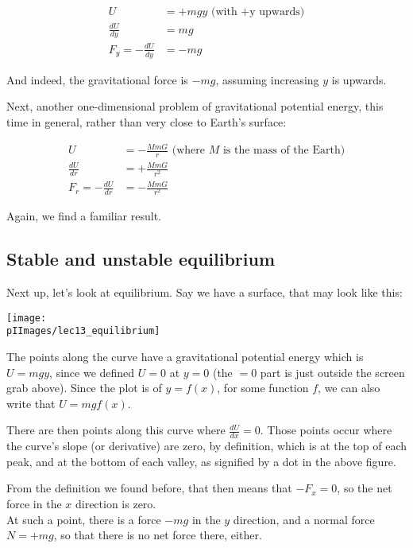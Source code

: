 \begin{align}
U &= + m g y \text{ (with +y upwards)}\\
\frac{dU}{dy} &= m g\\
F_y = -\frac{dU}{dy} &= - mg
\end{align}

And indeed, the gravitational force is $- m g$, assuming increasing $y$ is upwards.

Next, another one-dimensional problem of gravitational potential energy, this time in general, rather than very close to Earth's surface:

\begin{align}
U &= -\frac{M m G}{r} \text{ (where $M$ is the mass of the Earth)}\\
\frac{dU}{dr} &= +\frac{M m G}{r^2}\\
F_r = -\frac{dU}{dr} &= -\frac{M m G}{r^2}
\end{align}

Again, we find a familiar result.

\subsection{Stable and unstable equilibrium}

Next up, let's look at equilibrium. Say we have a surface, that may look like this:

\begin{center}
\texttt{[image: \\pIImages/lec13\_equilibrium]}
\end{center}

The points along the curve have a gravitational potential energy which is $U = m g y$, since we defined $U = 0$ at $y = 0$ (the $= 0$ part is just outside the screen grab above). Since the plot is of $y = f(x)$, for some function $f$, we can also write that $U = m g f(x)$.

There are then points along this curve where $\displaystyle \frac{dU}{dx} = 0$. Those points occur where the curve's slope (or derivative) are zero, by definition, which is at the top of each peak, and at the bottom of each valley, as signified by a dot in the above figure.

From the definition we found before, that then means that $-F_x = 0$, so the net force in the $x$ direction is zero.\\
At such a point, there is a force $-m g$ in the $y$ direction, and a normal force $N = + m g$, so that there is no net force there, either.

